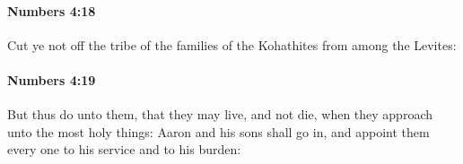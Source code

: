 		\paragraph{Numbers 4:18} %
			\label{NUMBERS-4-18}

			Cut ye not off the tribe of the families of the Kohathites from among the Levites:


		\paragraph{Numbers 4:19} %
			\label{NUMBERS-4-19}

			But thus do unto them, that they may live, and not die, when they approach unto the most holy things: Aaron and his sons shall go in, and appoint them every one to his service and to his burden:


